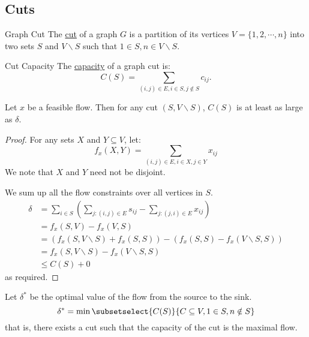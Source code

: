 \documentclass[../Main.tex]{subfiles}
\begin{document}
\subsection{Cuts}
\begin{definition}{Graph Cut}
    The \underline{cut} of a graph $G$ is a partition of its vertices $V = \{1, 2, \cdots, n\}$ into two sets $S$ and $V \backslash S$ such that $1 \in S, n \in V \backslash S$.
\end{definition}
\begin{definition}{Cut Capacity}
    The \underline{capacity} of a graph cut is:
    \begin{equation*}
        C(S) = \sum_{(i, j) \in E, i \in S, j \notin S} c_{ij}.
    \end{equation*}
\end{definition}
\begin{theorem}
    Let $x$ be a feasible flow. Then for any cut $(S, V \backslash S)$, $C(S)$ is at least as large as $\delta$.
\label{thmMaxFlowLessMinCut}
\end{theorem}
\begin{proof}
    For any sets $X$ and $Y \subseteq V$, let:
    \begin{equation*}
        f_x(X, Y) = \sum_{(i, j) \in E, i \in X, j \in Y} x_{ij}
    \end{equation*}
    We note that $X$ and $Y$ need not be disjoint.

    We sum up all the flow constraints over all vertices in $S$.
    \begin{align*}
        \delta &= \sum_{i \in S} \left(\sum_{j : (i, j) \in E} s_{ij} - \sum_{j : (j, i) \in E} x_{ij}\right) \\
        &= f_x(S, V) - f_x(V, S) \\
        &= \left(f_x(S, V \backslash S) + f_x(S, S)\right) - \left(f_x(S, S) - f_x(V \backslash S, S)\right) \\
        &= f_x(S, V \backslash S) - f_x(V \backslash S, S) \\
        &\leq C(S) + 0
    \end{align*}
    as required.
\end{proof}
\begin{theorem}
    Let $\delta^*$ be the optimal value of the flow from the source to the sink.
    \begin{equation*}
        \delta^* = \min \subsetselect{C(S)}{C \subseteq V, 1 \in S, n \notin S}
    \end{equation*}
    that is, there exists a cut such that the capacity of the cut is the maximal flow.
\label{thmMaxFlowMinCut}
\end{theorem}
\end{document}

